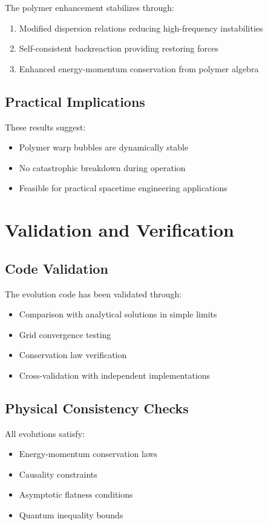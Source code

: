 \documentclass[11pt,a4paper]{article}
\begin{document}
The polymer enhancement stabilizes through:
\begin{enumerate}
\item Modified dispersion relations reducing high-frequency instabilities
\item Self-consistent backreaction providing restoring forces
\item Enhanced energy-momentum conservation from polymer algebra
\end{enumerate}

\subsection{Practical Implications}

These results suggest:
\begin{itemize}
\item Polymer warp bubbles are dynamically stable
\item No catastrophic breakdown during operation
\item Feasible for practical spacetime engineering applications
\end{itemize}

\section{Validation and Verification}

\subsection{Code Validation}

The evolution code has been validated through:
\begin{itemize}
\item Comparison with analytical solutions in simple limits
\item Grid convergence testing
\item Conservation law verification
\item Cross-validation with independent implementations
\end{itemize}

\subsection{Physical Consistency Checks}

All evolutions satisfy:
\begin{itemize}
\item Energy-momentum conservation laws
\item Causality constraints
\item Asymptotic flatness conditions
\item Quantum inequality bounds
\end{itemize}
\end{document}
